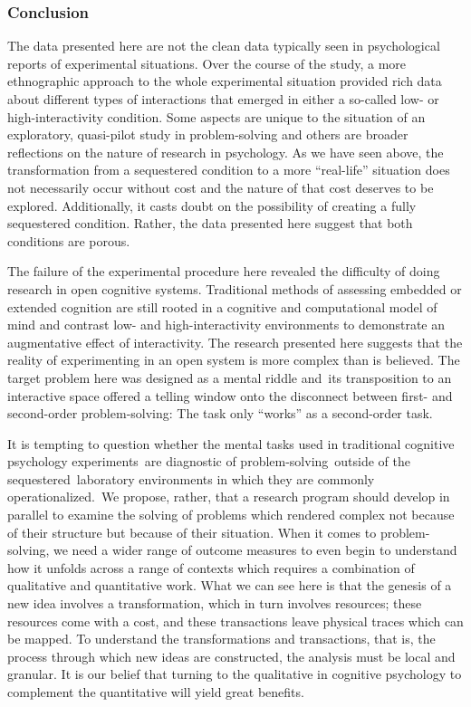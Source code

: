 \hypertarget{conclusion}{%
\subsubsection{Conclusion}\label{conclusion}}

The data presented here are not the clean data typically seen in
psychological reports of experimental situations. Over the course of the
study, a more ethnographic approach to the whole experimental situation
provided rich data about different types of interactions that emerged in
either a so-called low- or high-interactivity condition. Some aspects
are unique to the situation of an exploratory, quasi-pilot study in
problem-solving and others are broader reflections on the nature of
research in psychology. As we have seen above, the transformation from a
sequestered condition to a more ``real-life'' situation does not
necessarily occur without cost and the nature of that cost deserves to
be explored. Additionally, it casts doubt on the possibility of creating
a fully sequestered condition. Rather, the data presented here suggest
that both conditions are porous.

The failure of the experimental procedure here revealed the difficulty
of doing research in open cognitive systems. Traditional methods of
assessing embedded or extended cognition are still rooted in a cognitive
and computational model of mind and contrast low- and high-interactivity
environments to demonstrate an augmentative effect of interactivity. The
research presented here suggests that the reality of experimenting in an
open system is more complex than is believed. The target problem here
was designed as a mental riddle and~its transposition to an interactive
space offered a telling window onto the disconnect between first- and
second-order problem-solving: The task only ``works'' as a second-order
task.

It is tempting to question whether the mental tasks used in traditional
cognitive psychology experiments~are diagnostic of
problem-solving~outside of the sequestered~laboratory environments in
which they are commonly operationalized.~We propose, rather, that a
research program should develop in parallel to examine the solving of
problems which rendered complex not because of their structure but
because of their situation. When it comes to problem-solving, we need a
wider range of outcome measures to even begin to understand how it
unfolds across a range of contexts which requires a combination of
qualitative and quantitative work. What we can see here is that the
genesis of a new idea involves a transformation, which in turn involves
resources; these resources come with a cost, and these transactions
leave physical traces which can be mapped. To understand the
transformations and transactions, that is, the process through which new
ideas are constructed, the analysis must be local and granular. It is
our belief that turning to the qualitative in cognitive psychology to
complement the quantitative will yield great benefits.

